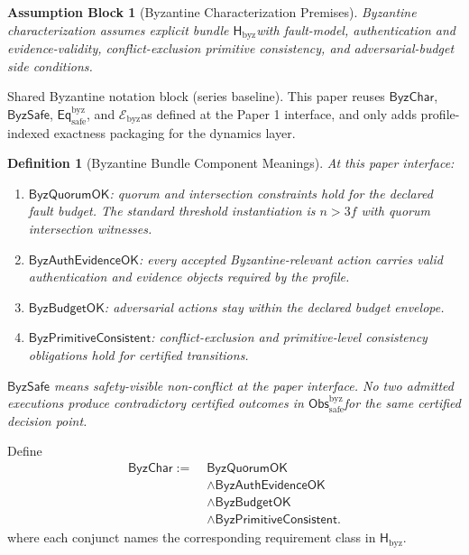 \documentclass[a4paper,10pt,twocolumn,english]{article}
\numberwithin{equation}{section}
\theoremstyle{paperdef}
\newtheorem{definition}{Definition}[section]
\theoremstyle{paperplain}
\theoremstyle{paperdef}
\newtheorem{assumption}{Assumption Block}[section]
\theoremstyle{paperremark}
\newcommand{\Hbyz}{\ensuremath{\mathsf{H}_{\mathrm{byz}}}}
\newcommand{\Obssafe}{\ensuremath{\mathsf{Obs}_{\mathrm{safe}}^{\mathrm{byz}}}}
\newcommand{\Eqsafe}{\ensuremath{\mathsf{Eq}_{\mathrm{safe}}^{\mathrm{byz}}}}
\newcommand{\Ebyz}{\ensuremath{\mathcal{E}_{\mathrm{byz}}}}
\newcommand{\ByzSafe}{\ensuremath{\mathsf{ByzSafe}}}
\newcommand{\ByzChar}{\ensuremath{\mathsf{ByzChar}}}
\begin{document}
\begin{assumption}[Byzantine Characterization Premises]
	\label{assump:p2-byzantine}
	Byzantine characterization assumes explicit bundle \Hbyz with fault-model, authentication and evidence-validity, conflict-exclusion primitive consistency, and adversarial-budget side conditions.
\end{assumption}

Shared Byzantine notation block (series baseline). This paper reuses
$\ByzChar$, $\ByzSafe$, \Eqsafe, and \Ebyz as defined at the Paper 1 interface,
and only adds profile-indexed exactness packaging for the dynamics layer.

\begin{definition}[Byzantine Bundle Component Meanings]
	At this paper interface:
	\begin{enumerate}
		\item $\mathsf{ByzQuorumOK}$: quorum and intersection constraints hold for the declared fault budget. The standard threshold instantiation is $n>3f$ with quorum intersection witnesses.
		\item $\mathsf{ByzAuthEvidenceOK}$: every accepted Byzantine-relevant action carries valid authentication and evidence objects required by the profile.
		\item $\mathsf{ByzBudgetOK}$: adversarial actions stay within the declared budget envelope.
		\item $\mathsf{ByzPrimitiveConsistent}$: conflict-exclusion and primitive-level consistency obligations hold for certified transitions.
	\end{enumerate}
	$\ByzSafe$ means safety-visible non-conflict at the paper interface. No two admitted executions produce contradictory certified outcomes in \Obssafe for the same certified decision point.
\end{definition}

Define
\begin{equation}
	\begin{aligned}
		\ByzChar :=\; & \mathsf{ByzQuorumOK}                   \\
		              & \land \mathsf{ByzAuthEvidenceOK}       \\
		              & \land \mathsf{ByzBudgetOK}             \\
		              & \land \mathsf{ByzPrimitiveConsistent}.
	\end{aligned}
\end{equation}
where each conjunct names the corresponding requirement class in \Hbyz.
\end{document}
